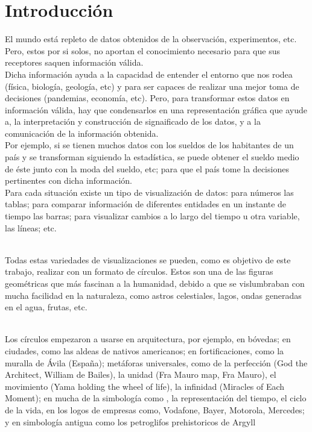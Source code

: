 \documentclass{article}\usepackage[]{graphicx}\usepackage[]{color}
\begin{document}
\section{Introducci\'on}
El mundo est\'a repleto de datos obtenidos de la observaci\'on, experimentos, etc. Pero, estos por si solos, no aportan el conocimiento necesario para que sus receptores saquen informaci\'on v\'alida.~\\
Dicha informaci\'on ayuda a la capacidad de entender el entorno que nos rodea (f\'isica, biolog\'ia, geolog\'ia, etc) y para ser capaces de realizar una mejor toma de decisiones (pandemias, econom\'ia, etc).
Pero, para transformar estos datos en informaci\'on v\'alida, hay que condensarlos en una representaci\'on gr\'afica que ayude a, la interpretaci\'on y construcci\'on de signaificado de los datos, y a la comunicaci\'on de la informaci\'on obtenida.~\\
Por ejemplo, si se tienen muchos datos con los sueldos de los habitantes de un pa\'is y se transforman siguiendo la estad\'istica, se puede obtener el sueldo medio de \'este junto con la moda del sueldo, etc; para que el pa\'is tome la decisiones pertinentes con dicha informaci\'on.~\\
Para cada situaci\'on existe un tipo de visualizaci\'on de datos: para n\'umeros las tablas; para comparar informaci\'on de diferentes entidades en un instante de tiempo las barras; para visualizar cambios a lo largo del tiempo u otra variable, las l\'ineas; etc.~\\~\par
Todas estas variedades de visualizaciones se pueden, como  es objetivo de este trabajo, realizar con un formato de c\'irculos. Estos son una de las figuras geom\'etricas que m\'as fascinan a la humanidad, debido a que se vislumbraban con mucha facilidad en la naturaleza, como astros celestiales, lagos, ondas generadas en el agua, frutas, etc.~\\~\par
Los c\'irculos empezaron a usarse en arquitectura, por ejemplo, en b\'ovedas; en ciudades, como las aldeas de nativos americanos; en fortificaciones, como la muralla de \'Avila (Espa\~na); met\'aforas universales, como de la perfecci\'on (God the Architect, William de Bailes), la unidad (Fra Mauro map, Fra Mauro), el movimiento (Yama holding the wheel of life), la infinidad (Miracles of Each Moment); en mucha de la simbolog\'ia como , la representaci\'on del tiempo, el ciclo de la vida, en los logos de empresas como, Vodafone, Bayer, Motorola, Mercedes; y en simbolog\'ia antigua como los petroglifos prehistoricos de Argyll \cite[p\'ag 15-54]{Circle}
\end{document}
